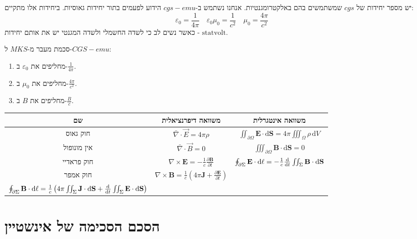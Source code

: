 \documentclass{tstextbook}
\begin{document}
יש מספר יחידות של \(cgs\) שמשתמשים בהם באלקטרומגנטיות. אנחנו נשתמש ב-\(cgs-emu\) הידוע לפעמים בתור יחידות גאוסיות. ביחידות אלו מתקיים:
$$\varepsilon_{0}=\frac{1}{4\pi}\quad \varepsilon_{0}\mu_{0}=\frac{1}{c^{2}}\quad \mu_{0}=\frac{4\pi}{c^{2}}$$
כאשר נשים לב כי לשדה החשמלי ולשדה המגנטי יש את אותם יחידות - \(\mathrm{statvolt}\).

סכמת מעבר מ-\(MKS\) ל-\(CGS-emu\):

\begin{enumerate}
  \item מחליפים את \(\varepsilon_{0}\) ב-\(\frac{1}{4\pi}\). 


  \item מחליפים את \(\mu_{0}\) ב-\(\frac{4\pi}{c^{2}}\). 


  \item מחליפים את \(B\) ב-\(\frac{B}{c}\). 


\end{enumerate}
\begin{table}[htbp]
  \centering
  \begin{tabular}{|ccc|}
    \hline
    שם & משוואה דיפרנציאלית & משוואה אינטגרלית \\ \hline
    חוק גאוס & \(\bar{\nabla} \cdot \vec{E}=4\pi \rho\) & \(\iint_{\partial\Omega}\mathbf{E}\cdot\mathrm{d}\mathbf{S}=4\pi\iiint_{\Omega}\rho\,\mathrm{d}V\) \\ \hline
    אין מונופול & \(\bar{\nabla} \cdot \vec{B}=0\) & \(\iiint_{\partial\Omega}\mathbf{B}\cdot\mathrm{d}\mathbf{S}=0\) \\ \hline
    חוק פראדיי & \(\nabla\times\mathbf{E}=-{\frac{1}{c}}{\frac{\partial\mathbf{B}}{\partial t}}\) & \(\oint_{\partial\Sigma}\mathbf{E}\cdot\mathrm{d}{\bf{\ell}}=-{\frac{1}{c}}{\frac{\mathrm{d}}{\mathrm{d}t}}\iint_{\Sigma}\mathbf{B}\cdot\mathrm{d}\mathbf{S}\) \\ \hline
    חוק אמפר & \(\nabla\times\mathbf{B}={\frac{1}{c}}\left(4\pi\mathbf{J}+{\frac{\partial\mathbf{E}}{\partial t}}\right)\) & \\
\(\oint_{\partial\Sigma}\mathbf{B}\cdot\mathrm{d}{\bf{\ell}}={\frac{1}{c}}\left(4\pi\iint_{\Sigma}\mathbf{J}\cdot\mathrm{d}\mathbf{S}+{\frac{\mathrm{d}}{\mathrm{d}t}}\iint_{\Sigma}\mathbf{E}\cdot\mathrm{d}\mathbf{S}\right)\) \\ \hline
  \end{tabular}
\end{table}
\section{הסכם הסכימה של אינשטיין}
\end{document}
